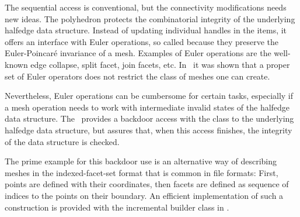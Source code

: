 \noindent
The sequential access is conventional, but the connectivity
modifications needs new ideas. The polyhedron protects the
combinatorial integrity of the underlying halfedge data structure.
Instead of updating individual handles in the items, it offers an
interface with Euler operations, so called because they preserve the
Euler-Poincar\'e invariance of a mesh. Examples of Euler operations
are the well-known edge collapse, split facet, join facets, etc.
In~\cite{Maentylae88} it was shown that a proper set of Euler
operators does not restrict the class of meshes one can create.

Nevertheless, Euler operations can be cumbersome for certain tasks,
especially if a mesh operation needs to work with intermediate invalid
states of the halfedge data structure. The \cgalpoly\ provides a
backdoor access with the  class to the
underlying halfedge data structure, but assures that, when this access
finishes, the integrity of the data structure is checked.

The prime example for this backdoor use is an alternative way of
describing meshes in the indexed-facet-set format that is common in file
formats: First, points are defined with their coordinates, then facets
are defined as sequence of indices to the points on their boundary. An
efficient implementation of such a construction is provided with the
incremental builder class in \cgal. 









